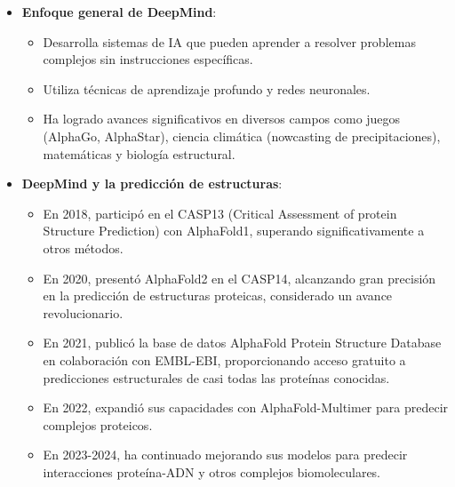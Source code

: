 \documentclass[11pt,a4paper]{article}
\begin{document}
  \begin{itemize}[noitemsep,topsep=0pt,leftmargin=*]
    \item \textbf{Enfoque general de DeepMind}:
    \begin{itemize}[noitemsep,topsep=0pt]
      \item Desarrolla sistemas de IA que pueden aprender a resolver problemas complejos sin instrucciones específicas.
      \item Utiliza técnicas de aprendizaje profundo y redes neuronales.
      \item Ha logrado avances significativos en diversos campos como juegos (AlphaGo, AlphaStar), ciencia climática (nowcasting de precipitaciones), matemáticas y biología estructural.
    \end{itemize}
    
    \item \textbf{DeepMind y la predicción de estructuras}:
    \begin{itemize}[noitemsep,topsep=0pt]
      \item En 2018, participó en el CASP13 (Critical Assessment of protein Structure Prediction) con AlphaFold1, superando significativamente a otros métodos.
      \item En 2020, presentó AlphaFold2 en el CASP14, alcanzando gran precisión en la predicción de estructuras proteicas, considerado un avance revolucionario.
      \item En 2021, publicó la base de datos AlphaFold Protein Structure Database en colaboración con EMBL-EBI, proporcionando acceso gratuito a predicciones estructurales de casi todas las proteínas conocidas.
      \item En 2022, expandió sus capacidades con AlphaFold-Multimer para predecir complejos proteicos.
      \item En 2023-2024, ha continuado mejorando sus modelos para predecir interacciones proteína-ADN y otros complejos biomoleculares.
    \end{itemize}
  \end{itemize}
  
\end{document}
